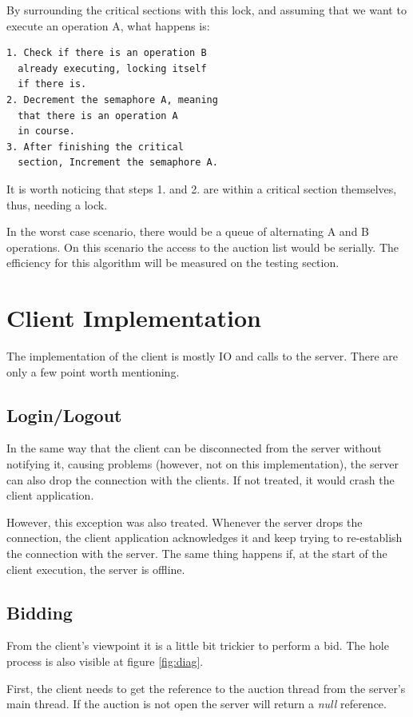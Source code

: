 \documentclass[twocolumn,10pt]{article}
\begin{document}
By surrounding the critical sections with this lock, and assuming that we want to execute an operation A, what happens is: 

\begin{lstlisting}
1. Check if there is an operation B 
  already executing, locking itself 
  if there is.
2. Decrement the semaphore A, meaning 
  that there is an operation A 
  in course.
3. After finishing the critical 
  section, Increment the semaphore A.
\end{lstlisting}

It is worth noticing that steps 1. and 2. are within a critical section themselves, thus, needing a lock.

In the worst case scenario, there would be a queue of alternating A and B operations. On this scenario the access to the auction list would be serially. The efficiency for this algorithm will be measured on the testing section.

\section{Client Implementation}
The implementation of the client is mostly IO and calls to the server. There are only a few point worth mentioning.

\subsection{Login/Logout}
In the same way that the client can be disconnected from the server without notifying it, causing problems (however, not on this implementation), the server can also drop the connection with the clients. If not treated, it would crash the client application.

However, this exception was also treated. Whenever the server drops the connection, the client application acknowledges it and keep trying to re-establish the connection with the server. The same thing happens if, at the start of the client execution, the server is offline.

\subsection{Bidding}
From the client's viewpoint it is a little bit trickier to perform a bid. The hole process is also visible at figure \ref{fig:diag}. 

First, the client needs to get the reference to the auction thread from the server's main thread. If the auction is not open the server will return a \textit{null} reference.
\end{document}
